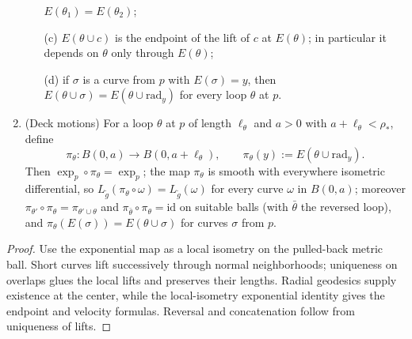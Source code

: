 \begin{lemma}
\begin{enumerate}
\begin{enumerate}
$E(\theta_1)=E(\theta_2)$;
\item[(c)] $E(\theta\cup c)$ is the endpoint of the lift of $c$ at
$E(\theta)$; in particular it depends on $\theta$ only through
$E(\theta)$;
\item[(d)] if $\sigma$ is a curve from $p$ with
$E(\sigma)=y$, then $E(\theta\cup\sigma)
=E(\theta\cup\mathrm{rad}_y)$ for every loop $\theta$ at $p$.
\end{enumerate}
\item (Deck motions) For a loop $\theta$ at $p$ of length
$\ell_\theta$ and $a>0$ with $a+\ell_\theta<\rho_*$, define
$$\pi_\theta\colon B(0,a)\to B(0,a+\ell_\theta),\qquad
\pi_\theta(y):=E(\theta\cup\mathrm{rad}_y).$$
Then $\exp_p\circ\pi_\theta=\exp_p$; the map
$\pi_\theta$ is smooth with everywhere isometric differential, so
$L_{\tilde g}(\pi_\theta\circ\omega)=L_{\tilde g}(\omega)$ for
every curve $\omega$ in $B(0,a)$; moreover
$\pi_{\theta'}\circ\pi_\theta=\pi_{\theta'\cup\theta}$ and
$\pi_{\bar\theta}\circ\pi_\theta=\mathrm{id}$ on suitable balls
(with $\bar\theta$ the reversed loop), and
$\pi_\theta(E(\sigma))=E(\theta\cup\sigma)$ for curves $\sigma$
from $p$.
\end{enumerate}
\end{lemma}

\begin{proof}
\sketch
{}
Use the exponential map as a local isometry on the pulled-back metric ball. Short curves lift successively through normal neighborhoods; uniqueness on overlaps glues the local lifts and preserves their lengths. Radial geodesics supply existence at the center, while the local-isometry exponential identity gives the endpoint and velocity formulas. Reversal and concatenation follow from uniqueness of lifts.
\end{proof}

